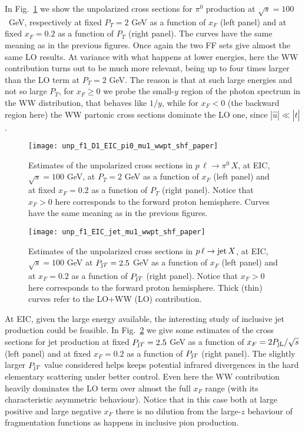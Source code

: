 \documentclass[nofootinbib,superscriptaddress,aps]{revtex4}
\begin{document}
In Fig.~\ref{fig:unp-eic-pi0} we show the unpolarized cross sections for $\pi^0$ production at $\sqrt s = 100$~GeV, respectively at fixed $P_T=2$ GeV as a function of $x_F$ (left panel) and at fixed $x_F=0.2$ as a function of $P_T$ (right panel). The curves have the same meaning as in the previous figures. Once again the two FF sets give almost the same LO results. At variance with what happens at lower energies, here the WW contribution turns out to be much more relevant, being up to four times larger than the LO term at $P_T=2$ GeV. The reason is that at such large energies and not so large $P_T$, for $x_F\geq 0$ we probe the small-$y$ region of the photon spectrum in the WW distribution, that behaves like $1/y$, while for $x_F <0$ (the backward region here)  the WW partonic cross sections dominate the LO one,  since $|\hat u| \ll |\hat t|$.


\begin{figure}[ht!]
 \centering
 \texttt{[image: unp\_f1\_D1\_EIC\_pi0\_mu1\_wwpt\_shf\_paper]}
 \caption{Estimates of the unpolarized cross sections in $p \,\ell \to \pi^0\,X$, at EIC, $\sqrt{s} = 100$ GeV, at $P_T=2$ GeV as a function of $x_F$ (left panel) and at fixed $x_F=0.2$ as a function of $P_T$ (right panel). Notice that $x_F>0$ here corresponds to the forward proton hemisphere. Curves have the same meaning as in the previous figures.
}
  \label{fig:unp-eic-pi0}
\end{figure}

\begin{figure}[ht!]
 \centering
 \texttt{[image: unp\_f1\_EIC\_jet\_mu1\_wwpt\_shf\_paper]}
 \caption{Estimates of the unpolarized cross sections in $p\, \ell \to {\rm jet} \,X$, at EIC, $\sqrt{s} = 100$ GeV at $P_{{\rm j}T}=2.5$ GeV as a function of $x_F$ (left panel) and at $x_F=0.2$ as a function of $P_{{\rm j}T}$ (right panel). Notice that $x_F>0$ here corresponds to the forward proton hemisphere. Thick (thin) curves refer  to the LO+WW (LO) contribution.
}
  \label{fig:unp-eic-jet}
\end{figure}


At EIC, given the large energy available, the interesting study of inclusive jet production could be feasible. In Fig.~\ref{fig:unp-eic-jet} we give some estimates of the cross sections for jet production at fixed $P_{{\rm j}T}=2.5$ GeV as a function of $x_F = 2 P_{\rm{j} L}/\sqrt s$ (left panel) and at fixed $x_F=0.2$ as a function of $P_{{\rm j}T}$ (right panel).
The slightly larger $P_{{\rm j}T}$ value considered helps keeps potential infrared divergences in the hard elementary scattering under better control. Even here the WW contribution heavily dominates the LO term over almost the full $x_F$ range (with its characteristic asymmetric behaviour). Notice that in this case both at large positive and large negative $x_F$ there is no dilution from the large-$z$ behaviour of fragmentation functions as happens in inclusive pion production.
\end{document}
